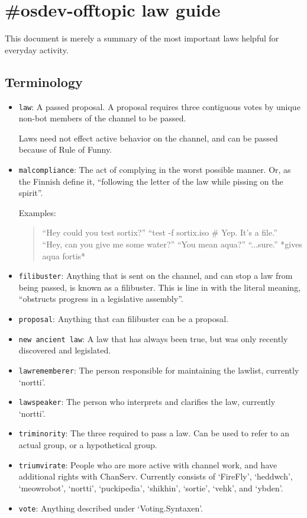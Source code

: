 \documentclass[11pt]{article}
\begin{document}
\section{\#osdev-offtopic law guide}

This document is merely a summary of the most important laws helpful for everyday activity.

\subsection{Terminology}

\begin{itemize}
\item \texttt{law}: A passed proposal. A proposal requires three contiguous votes
by unique non-bot members of the channel to be passed.

Laws need not effect active behavior on the channel, and can be passed because of
Rule of Funny.

\item \texttt{malcompliance}: The act of complying in the worst possible manner. Or,
as the Finnish define it, ``following the letter of the law while pissing on the spirit''.

Examples:
\begin{quote}
``Hey could you test sortix?'' ``test -f sortix.iso \# Yep. It's a file.'' \\
``Hey, can you give me some water?'' ``You mean aqua?'' ``...sure.'' *gives aqua fortis*
\end{quote}

\item \texttt{filibuster}: Anything that is sent on the channel, and can stop a
law from being passed, is known as a filibuster. This is line in with the literal meaning, ``obstructs progress in a legislative assembly''.

\item \texttt{proposal}: Anything that can filibuster can be a proposal.

\item \texttt{new ancient law}: A law that has always been true, 
but was only recently discovered and legislated.

\item \texttt{lawrememberer}: The person responsible for maintaining the lawlist,
currently `nortti'.

\item \texttt{lawspeaker}: The person who interprets and clarifies the law,
currently `nortti'.

\item \texttt{triminority}: The three required to pass a law. Can be used to refer to
an actual group, or a hypothetical group.

\item \texttt{triumvirate}: People who are more active with channel work, and have additional rights with ChanServ. Currently consists of `FireFly', `heddwch', `meowrobot', `nortti', `puckipedia', `shikhin', `sortie', `vehk', and `ybden'.

\item \texttt{vote}: Anything described under `Voting.Syntaxen'.
\end{itemize}
\end{document}

